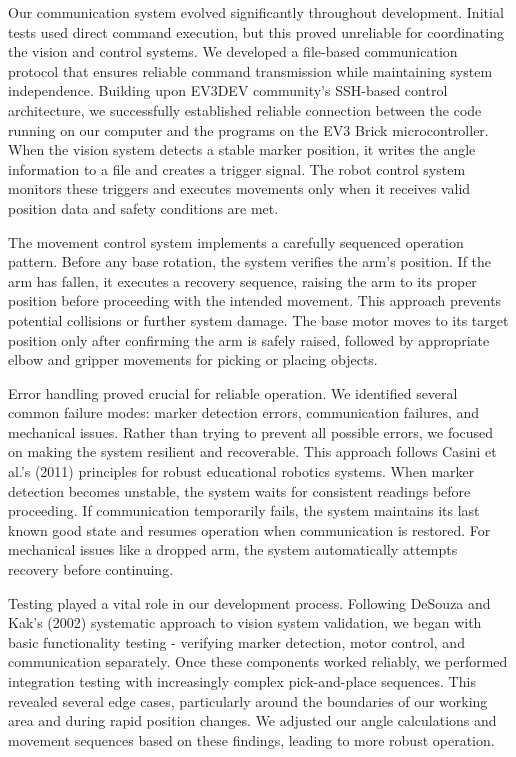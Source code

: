 \documentclass[10pt,twocolumn]{article}
\begin{document}
Our communication system evolved significantly throughout development. Initial tests used direct command execution, but this proved unreliable for coordinating the vision and control systems. We developed a file-based communication protocol that ensures reliable command transmission while maintaining system independence. Building upon EV3DEV community’s SSH-based control architecture, we successfully established reliable connection between the code running on our computer and the programs on the EV3 Brick microcontroller. When the vision system detects a stable marker position, it writes the angle information to a file and creates a trigger signal. The robot control system monitors these triggers and executes movements only when it receives valid position data and safety conditions are met.

The movement control system implements a carefully sequenced operation pattern. Before any base rotation, the system verifies the arm's position. If the arm has fallen, it executes a recovery sequence, raising the arm to its proper position before proceeding with the intended movement. This approach prevents potential collisions or further system damage. The base motor moves to its target position only after confirming the arm is safely raised, followed by appropriate elbow and gripper movements for picking or placing objects.

Error handling proved crucial for reliable operation. We identified several common failure modes: marker detection errors, communication failures, and mechanical issues. Rather than trying to prevent all possible errors, we focused on making the system resilient and recoverable. This approach follows Casini et al.'s (2011) \cite{casini2011lego} principles for robust educational robotics systems. When marker detection becomes unstable, the system waits for consistent readings before proceeding. If communication temporarily fails, the system maintains its last known good state and resumes operation when communication is restored. For mechanical issues like a dropped arm, the system automatically attempts recovery before continuing.

Testing played a vital role in our development process. Following DeSouza and Kak's (2002) \cite{desouza2002vision} systematic approach to vision system validation, we began with basic functionality testing - verifying marker detection, motor control, and communication separately. Once these components worked reliably, we performed integration testing with increasingly complex pick-and-place sequences. This revealed several edge cases, particularly around the boundaries of our working area and during rapid position changes. We adjusted our angle calculations and movement sequences based on these findings, leading to more robust operation.
\end{document}
